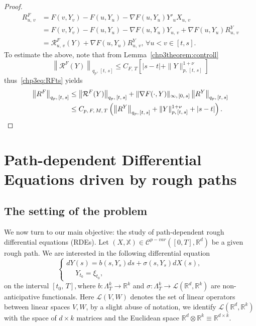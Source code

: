 \documentclass[10pt]{amsart}
\theoremstyle{definition}\newtheorem{defi}[theo]{Definition}\newtheorem{rema}[theo]{Remark}\newtheorem{exam}[theo]{Example}\newtheorem{exem}[theo]{Example}\newtheorem{nota}[theo]{Notation}
\newcommand{\bbX}{\mathbb{X}}
\newcommand{\calR}{\mathcal{R}}
\newcommand{\calL}{\mathcal{L}}
\newcommand{\calC}{\mathcal{C}}
\newcommand{\Rr}{{\mathbb{R}}}
\let\oldforall\forall
\renewcommand*{\forall}{\mathrel{\oldforall}}
\begin{document}
\begin{proof}
\begin{equation}
\begin{split}
R^F_{u,\,v}&=F\left(v,Y_v\right)-F\left(u,Y_u\right)-\nabla F\left(u,Y_u\right)Y'_uX_{u,\,v}\\
&=F\left(v,Y_v\right)-F\left(u,Y_u\right)-\nabla F\left(u,Y_u\right)Y_{u,\,v}+\nabla F\left(u,Y_u\right)R^Y_{u,\,v}\\
&=\calR^{F}_{u,\,v}(Y)+\nabla F\left(u,Y_u\right)R^Y_{u,\,v},\, \forall u< v \in [t, s].
\end{split}
\end{equation}
To estimate the above, note that from Lemma~\ref{chp3theorem:controll}
\[
\left\|\calR^{F}(Y)\right\|_{q_p,\,[t,\,s]}\leq C_{F,\,T} \left[|s-t|+\|Y\|_{p,\,[t,\,s]}^{1+\nu}\right]
\]
thus~\eqref{chp3eq:RFts} yields
\begin{equation}\label{chp3eq:RFfin}
\begin{split}
\left\|R^F\right\|_{q_p,\,[t,\,s]}&\leq \left\|\calR^{F}(Y)\right\|_{q_p,\,[t,\,s]}+\|\nabla F(\cdot,Y)\|_{\infty,\,[0,\,s]}\left\|R^Y\right\|_{q_p,\, [t,\,s]}\\
&\leq C_{p,\,F,\,M,\,T}\left(
\left\|R^Y\right\|_{q_p,\,[t,\,s]}+ \|Y\|_{p,\, [t,\,s]}^{1+\nu}+|s-t|\right).\qedhere
\end{split}
\end{equation}
\end{proof}



\section{Path-dependent Differential Equations driven by rough paths}\label{chp:existence}

\subsection{The setting of the problem}
We now turn to our main objective: the study of path-dependent rough differential equations (RDEs). Let $(X,\bbX)\in \calC^{p-var}([0,T],\Rr^d)$ be a given rough path. We are interested in the following differential equation
\begin{equation}\label{chp3ode}
\begin{cases}
dY(s)= b(s, Y_s)ds+\sigma(s,Y_s)dX (s),\\
\quad\;Y_{t_0}=\xi_{t_0},
\end{cases}
\end{equation}
on the interval $[t_0,\,T],$where $ b\colon \Lambda_T^k\to\Rr^k$ and $\sigma\colon \Lambda_T^k \to \calL(\Rr^d,\Rr^k)$ are non-anticipative functionals. Here $\calL(V,W)$ denotes the set of linear operators between linear spaces $V, W$, by a slight abuse of notation, we identify $\calL(\Rr^d,\Rr^k)$ with the space of $d\times k$ matrices and the Euclidean space $\Rr^d\otimes\Rr^k\equiv\Rr^{d\times k}$.
\end{document}
